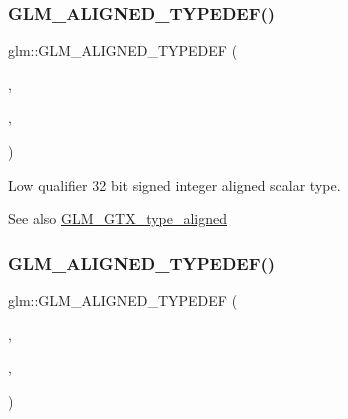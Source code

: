 \subsubsection{\texorpdfstring{G\+L\+M\+\_\+\+A\+L\+I\+G\+N\+E\+D\+\_\+\+T\+Y\+P\+E\+D\+E\+F()}{GLM\_ALIGNED\_TYPEDEF()}\hspace{0.1cm}{\footnotesize\ttfamily [3/209]}}
{\footnotesize\ttfamily glm\+::\+G\+L\+M\+\_\+\+A\+L\+I\+G\+N\+E\+D\+\_\+\+T\+Y\+P\+E\+D\+EF (\begin{DoxyParamCaption}\item[{\mbox{\hyperlink{group__gtc__type__precision_gad9939c9d6fec1c6accc02a83c6500f08}{lowp\+\_\+int32}}}]{,  }\item[{aligned\+\_\+lowp\+\_\+int32}]{,  }\item[{4}]{ }\end{DoxyParamCaption})}

Low qualifier 32 bit signed integer aligned scalar type. \begin{DoxySeeAlso}{See also}
\mbox{\hyperlink{group__gtx__type__aligned}{G\+L\+M\+\_\+\+G\+T\+X\+\_\+type\+\_\+aligned}} 
\end{DoxySeeAlso}
\mbox{\label{group__gtx__type__aligned_ga6612eb77c8607048e7552279a11eeb5f}} 
\subsubsection{\texorpdfstring{G\+L\+M\+\_\+\+A\+L\+I\+G\+N\+E\+D\+\_\+\+T\+Y\+P\+E\+D\+E\+F()}{GLM\_ALIGNED\_TYPEDEF()}\hspace{0.1cm}{\footnotesize\ttfamily [4/209]}}
{\footnotesize\ttfamily glm\+::\+G\+L\+M\+\_\+\+A\+L\+I\+G\+N\+E\+D\+\_\+\+T\+Y\+P\+E\+D\+EF (\begin{DoxyParamCaption}\item[{\mbox{\hyperlink{group__gtc__type__precision_gab8a8e75af347592406e41b3ae2c0712b}{lowp\+\_\+int64}}}]{,  }\item[{aligned\+\_\+lowp\+\_\+int64}]{,  }\item[{8}]{ }\end{DoxyParamCaption})}

